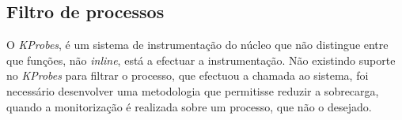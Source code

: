 \subsection{Filtro de processos}







O \textit{KProbes}, é um sistema de instrumentação do núcleo que não distingue entre que funções, não \textit{inline}, está a efectuar a instrumentação.
Não existindo suporte no \textit{KProbes} para filtrar o processo, que efectuou a chamada ao sistema, foi necessário desenvolver uma metodologia que permitisse reduzir a sobrecarga, quando a monitorização é realizada sobre um processo, que não o desejado.




